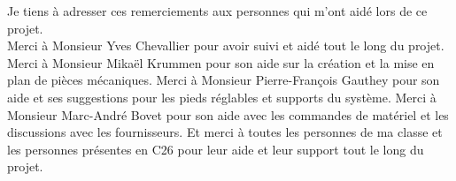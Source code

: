 Je tiens à adresser ces remerciements aux personnes qui m'ont aidé lors de ce projet.\\

Merci à Monsieur Yves Chevallier pour avoir suivi et aidé tout le long du projet.
\newline
Merci à Monsieur Mikaël Krummen pour son aide sur la création et la mise en plan de pièces mécaniques.
\newline
Merci à Monsieur Pierre-François Gauthey pour son aide et ses suggestions pour les pieds réglables et supports du système.
\newline
Merci à Monsieur Marc-André Bovet pour son aide avec les commandes de matériel et les discussions avec les fournisseurs.
\newline
Et merci à toutes les personnes de ma classe et les personnes présentes en C26 pour leur aide et leur support tout le long du projet.